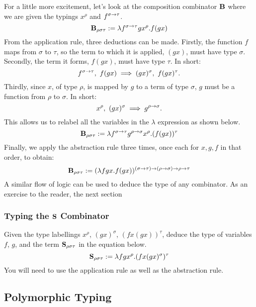 For a little more excitement, let's look at the composition combinator $\textbf B$ where we are given the typings $x^\rho$ and $f^{\sigma\rightarrow\tau}$.
\begin{equation}
    \textbf B_{\rho\sigma\tau}:=\lambda f^{\sigma\rightarrow\tau}gx^\rho.f(gx)
\end{equation}
From the application rule, three deductions can be made. Firstly, the function $f$ maps from $\sigma$ to $\tau$, so the term to which it is applied, $(gx)$, must have type $\sigma$. Secondly, the term it forms, $f(gx)$, must have type $\tau$. In short:
\begin{equation}
    f^{\sigma\ra\tau},\ f(gx)\implies(gx)^\sigma,\ f(gx)^\tau.
\end{equation}
Thirdly, since $x$, of type $\rho$, is mapped by $g$ to a term of type $\sigma$, $g$ must be a function from $\rho$ to $\sigma$. In short:
\begin{equation}
    x^\rho,\ (gx)^\sigma\implies g^{\rho\rightarrow\sigma}.
\end{equation}
This allows us to relabel all the variables in the $\lambda$ expression as shown below.
\begin{equation}
    \textbf B_{\rho\sigma\tau}:=\lambda f^{\sigma\rightarrow\tau}g^{\rho\rightarrow\sigma}x^\rho.(f(gx))^\tau
\end{equation}
Finally, we apply the abstraction rule three times, once each for $x, g, f$ in that order, to obtain:
\begin{equation}
    \textbf B_{\rho\sigma\tau}:=(\lambda fgx.f(gx))^{(\sigma\rightarrow\tau)\rightarrow(\rho\rightarrow\sigma)\rightarrow\rho\rightarrow\tau}
\end{equation}
A similar flow of logic can be used to deduce the type of any combinator. As an exercise to the reader, the next section

\subsubsection{Typing the $\textbf S$ Combinator}
Given the type labellings $x^\rho$, $(gx)^\sigma$, $(fx(gx))^\tau$, deduce the type of variables $f$, $g$, and the term $\textbf S_{\rho\sigma\tau}$ in the equation below.
\begin{equation}
    \textbf S_{\rho\sigma\tau}:=\lambda fgx^\rho.(fx(gx)^\sigma)^\tau
\end{equation}
You will need to use the application rule as well as the abstraction rule.

\subsection{Polymorphic Typing}

